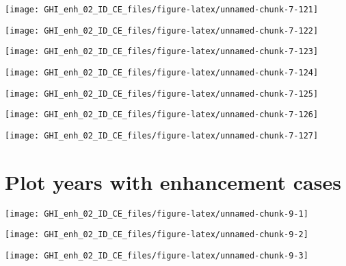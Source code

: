 \documentclass[
  10pt,
  a4paper,oneside]{article}
\begin{document}
\begin{center}\texttt{[image: GHI\_enh\_02\_ID\_CE\_files/figure-latex/unnamed-chunk-7-121]} \end{center}

\begin{center}\texttt{[image: GHI\_enh\_02\_ID\_CE\_files/figure-latex/unnamed-chunk-7-122]} \end{center}

\begin{center}\texttt{[image: GHI\_enh\_02\_ID\_CE\_files/figure-latex/unnamed-chunk-7-123]} \end{center}

\begin{center}\texttt{[image: GHI\_enh\_02\_ID\_CE\_files/figure-latex/unnamed-chunk-7-124]} \end{center}

\begin{center}\texttt{[image: GHI\_enh\_02\_ID\_CE\_files/figure-latex/unnamed-chunk-7-125]} \end{center}

\begin{center}\texttt{[image: GHI\_enh\_02\_ID\_CE\_files/figure-latex/unnamed-chunk-7-126]} \end{center}

\begin{center}\texttt{[image: GHI\_enh\_02\_ID\_CE\_files/figure-latex/unnamed-chunk-7-127]} \end{center}

\FloatBarrier

\hypertarget{plot-years-with-enhancement-cases}{%
\section{Plot years with enhancement cases}\label{plot-years-with-enhancement-cases}}

\begin{center}\texttt{[image: GHI\_enh\_02\_ID\_CE\_files/figure-latex/unnamed-chunk-9-1]} \end{center}

\begin{center}\texttt{[image: GHI\_enh\_02\_ID\_CE\_files/figure-latex/unnamed-chunk-9-2]} \end{center}

\begin{center}\texttt{[image: GHI\_enh\_02\_ID\_CE\_files/figure-latex/unnamed-chunk-9-3]} \end{center}
\end{document}
